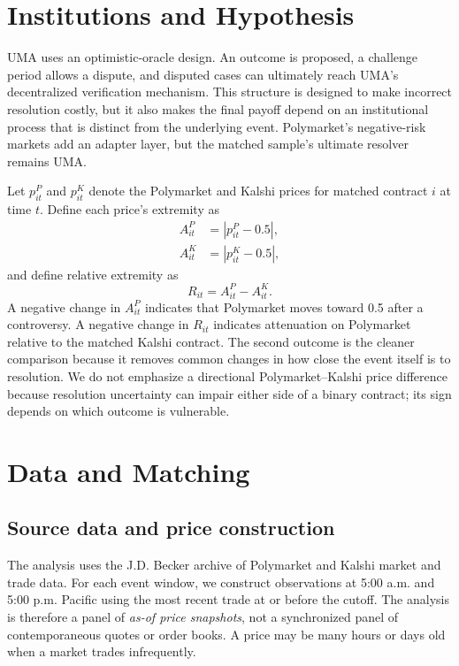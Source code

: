 \documentclass[11pt]{article}
\begin{document}
\section{Institutions and Hypothesis}

UMA uses an optimistic-oracle design. An outcome is proposed, a challenge period allows a
dispute, and disputed cases can ultimately reach UMA's decentralized verification mechanism.
This structure is designed to make incorrect resolution costly, but it also makes the final
payoff depend on an institutional process that is distinct from the underlying event.
Polymarket's negative-risk markets add an adapter layer, but the matched sample's ultimate
resolver remains UMA.

Let $p^{P}_{it}$ and $p^{K}_{it}$ denote the Polymarket and Kalshi prices for matched contract
$i$ at time $t$. Define each price's extremity as
\begin{align}
A^{P}_{it} &= \left|p^{P}_{it}-0.5\right|, \\
A^{K}_{it} &= \left|p^{K}_{it}-0.5\right|,
\end{align}
and define relative extremity as
\begin{equation}
R_{it}=A^{P}_{it}-A^{K}_{it}.
\end{equation}
A negative change in $A^{P}_{it}$ indicates that Polymarket moves toward 0.5 after a
controversy. A negative change in $R_{it}$ indicates attenuation on Polymarket relative to
the matched Kalshi contract. The second outcome is the cleaner comparison because it removes
common changes in how close the event itself is to resolution. We do not emphasize a
directional Polymarket--Kalshi price difference because resolution uncertainty can impair
either side of a binary contract; its sign depends on which outcome is vulnerable.

\section{Data and Matching}

\subsection{Source data and price construction}

The analysis uses the J.D. Becker archive of Polymarket and Kalshi market and trade data.
For each event window, we construct observations at 5:00 a.m. and 5:00 p.m. Pacific using
the most recent trade at or before the cutoff. The analysis is therefore a panel of
\emph{as-of price snapshots}, not a synchronized panel of contemporaneous quotes or order
books. A price may be many hours or days old when a market trades infrequently.
\end{document}
